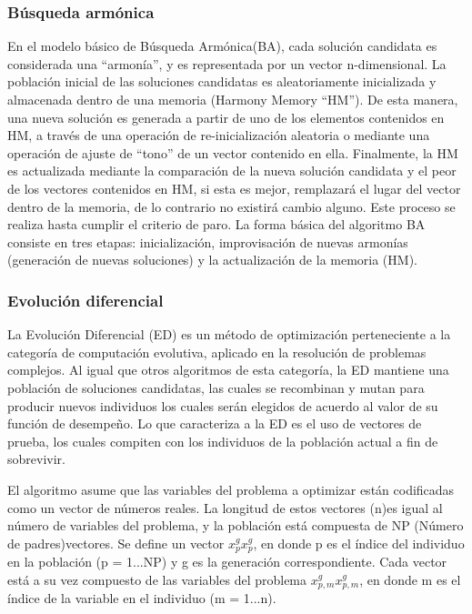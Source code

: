 \documentclass[a4paper,twocolumn,10pt]{article}
\begin{document}
\subsubsection*{Búsqueda armónica}
En el modelo básico de Búsqueda Armónica(BA), cada solución candidata es considerada una “armonía”, y es representada por un vector n-dimensional. La población inicial de las soluciones candidatas es aleatoriamente inicializada y almacenada dentro de una memoria (Harmony Memory “HM”). De esta manera, una nueva solución es generada a partir de uno de los elementos contenidos en HM, a través de una operación de re-inicialización aleatoria o mediante una operación de ajuste de “tono” de un vector contenido en ella. Finalmente, la HM es actualizada mediante la comparación de la nueva solución candidata y el peor de los vectores contenidos en HM, si esta es mejor, remplazará el lugar del vector dentro de la memoria, de lo contrario no existirá cambio alguno. Este proceso se realiza hasta cumplir el criterio de paro. La forma básica del algoritmo BA consiste en tres etapas: inicialización, improvisación de nuevas armonías (generación de nuevas soluciones) y la actualización de la memoria (HM). 

\subsubsection*{Evolución diferencial}

La Evolución Diferencial (ED) es un método de optimización perteneciente a la categoría de computación evolutiva, aplicado en la resolución de problemas complejos. Al igual que otros algoritmos de esta categoría, la ED mantiene una población de soluciones candidatas, las cuales se recombinan y mutan para producir nuevos individuos los cuales serán elegidos de acuerdo al valor de su función de desempeño. Lo que caracteriza a la ED es el uso de vectores de prueba, los cuales compiten con los individuos de la población actual a fin de sobrevivir.

El algoritmo asume que las variables del problema a optimizar están codificadas como un vector de números reales. La longitud de estos vectores (n)es igual al número de variables del problema, y la población está compuesta de NP (Número de padres)vectores. Se define un vector $ {\displaystyle x_{p}^{g}}{\displaystyle x_{p}^{g}}$, en donde p es el índice del individuo en la población (p = 1...NP) y g es la generación correspondiente. Cada vector está a su vez compuesto de las variables del problema ${\displaystyle x_{p,m}^{g}}{\displaystyle x_{p,m}^{g}}$, en donde m es el índice de la variable en el individuo (m = 1...n).
\end{document}
